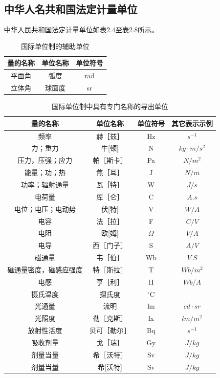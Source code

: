 \subsection{中华人名共和国法定计量单位}
中华人民共和国法定计量单位如表2.4至表2.8所示。
\begin{table}
	\centering
	\song\wuhao
	\caption{国际单位制的辅助单位}
	\begin{tabular}{ccc}
	\hline
	量的名称&单位名称&单位符号\\
	\hline
	平面角&弧度&rad\\
	立体角&球面度&sr\\
	\hline
	\end{tabular}
\end{table}

\begin{table}
	\centering
	\song\wuhao
	\caption{国际单位制中具有专门名称的导出单位}
	\begin{tabular}{cccc}
	\hline
	量的名称&单位名称&单位符号&其它表示示例\\
	\hline
	频率&赫［兹］&Hz&$s^{-1}$\\
	力；重力&牛[顿]&N&$kg·m/s^2$\\
	压力，压强；应力&帕［斯卡］&Pa&$N/m^2$\\
	能量；功；热&焦［耳］&J&$N/m$\\
	功率；辐射通量&瓦［特］&W&$J/s$\\
	电荷量&库［仑］&C&$A.s$\\
	电位；电压；电动势&伏[特]&V&$W/A$\\
	电容&法［拉］&F&$C/V$\\
	电阻&欧[姆]&$\Omega$&$V/A$\\
	电导&西［门子］&S&$A/V$\\
	磁通量&韦［伯］&Wb&$V.S$\\
	磁通量密度，磁感应强度&特［斯拉］&T&$Wb/m^2$\\
	电感&亨［利］&H&$Wb/A$\\
	摄氏温度&摄氏度&$^\circ$C&~\\
	光通量&流明&lm&$cd·sr$\\
	光照度&勒［克斯］&lx&$lm/m^2$\\
	放射性活度&贝可［勒尔］&Bq&$s^{-1}$\\
	吸收剂量&戈［瑞］&Gy&$J/kg$\\
	剂量当量&希［沃特］&Sv&$J/kg$\\
	\hline
	剂量当量&希[沃特]&Sv&$J/kg$\\
	\hline
	\end{tabular}
\end{table}

